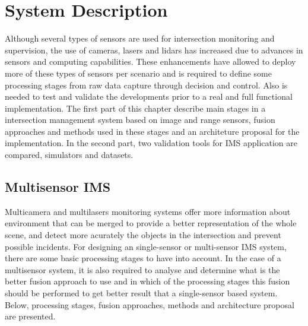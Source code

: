 
\chapter {System Description}

Although several types of sensors are used for intersection monitoring and supervision, the use of cameras, lasers and lidars has increased due to advances in sensors and computing capabilities. These enhancements have allowed to deploy more of these types of sensors per scenario and is required to define some processing stages from raw data capture through decision and control. Also is needed to test and validate the developments prior to a real and full functional implementation. The first part of this chapter describe main stages in a intersection management system based on image and range sensors, fusion approaches and methods used in these stages and an architeture proposal for the implementation. In the second part, two validation tools for IMS application are compared, simulators and datasets.

\section{Multisensor IMS}

Multicamera and multilasers monitoring systems offer more information about environment that can be merged to provide a better representation of the whole scene, and detect more acurately the objects in the intersection and prevent possible incidents. For designing an single-sensor or multi-sensor IMS system, there are some basic processing stages to have into account. In the case of a multisensor system, it is also required to analyse and determine what is the better fusion approach to use and in which of the processing stages this fusion should be performed to get better result that a single-sensor based system. Below, processing stages, fusion approaches, methods and architecture proposal are presented.

